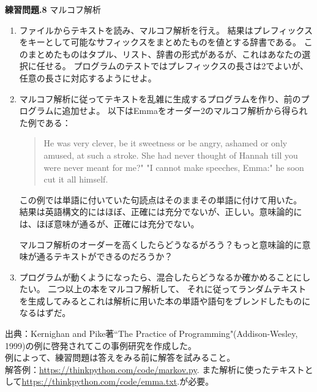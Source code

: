 \documentclass[a4j,12pt,makeidx]{jbook}
\newcommand{\tp}{\thechapter}
\begin{document}
\noindent
{\bf 練習問題\tp.8} マルコフ解析
\begin{enumerate}
\item ファイルからテキストを読み、マルコフ解析を行え。
結果はプレフィックスをキーとして可能なサフィックスをまとめたものを値とする辞書である。
このまとめたものはタプル、リスト、辞書の形式があるが、これはあなたの選択に任せる。
プログラムのテストではプレフィックスの長さは2でよいが、任意の長さに対応するようにせよ。
\item マルコフ解析に従ってテキストを乱雑に生成するプログラムを作り、前のプログラムに追加せよ。
以下はEmmaをオーダー2のマルコフ解析から得られた例である：
\begin{quote}
He was very clever, be it sweetness or be angry, ashamed or only
amused, at such a stroke. She had never thought of Hannah till you
were never meant for me?" "I cannot make speeches, Emma:" he soon cut
it all himself.
\end{quote}
この例では単語に付いていた句読点はそのままその単語に付けて用いた。
結果は英語構文的にはほぼ、正確には充分でないが、正しい。意味論的には、ほぼ意味が通るが、正確には充分でない。\par
マルコフ解析のオーダーを高くしたらどうなるがろう？もっと意味論的に意味が通るテキストができるのだろうか？
\item プログラムが動くようになったら、混合したらどうなるか確かめることにしたい。
二つ以上の本をマルコフ解析して、
それに従ってランダムテキストを生成してみるとこれは解析に用いた本の単語や語句をブレンドしたものになるはずだ。
\end{enumerate}
出典：Kernighan and Pike著``The Practice of Programming"(Addison-Wesley, 1999)の例に啓発されてこの事例研究を作成した。\\
例によって、練習問題は答えをみる前に解答を試みること。\\
解答例：\url{https://thinkpython.com/code/markov.py}.
 また解析に使ったテキストとして\url{https://thinkpython.com/code/emma.txt}.が必要。
\end{document}
